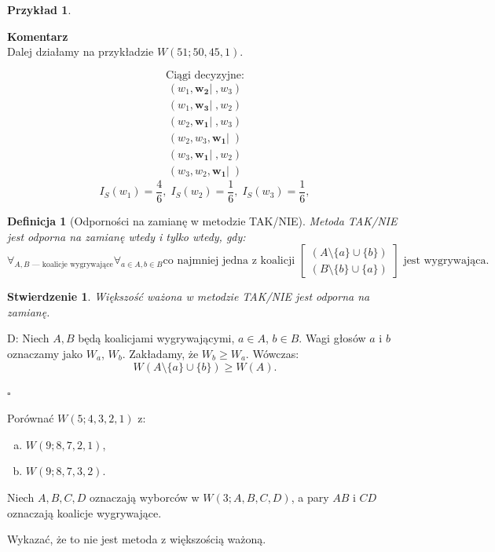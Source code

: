 \documentclass[12pt,a4paper]{article}
\newcounter{twierdzenie}
\theoremstyle{break}
\newcommand{\Komentarz}[1]{
	\begin{mdframed}[style=zadanie]
		\textbf{Komentarz}\\
		#1
	\end{mdframed}
	}
\newtheorem{definition}{Definicja}[section]
\newtheorem{example}{Przykład}[section]
\newtheorem{stwierdzenie}{Stwierdzenie}[section]
\begin{document}
	\begin{example}\end{example}
	\Komentarz{Dalej działamy na przykładzie $W(51;50,45,1)$.}
		
	\[
	\text{Ciągi decyzyjne:}
	\]
	\begin{align*}
		(w_1, \mathbf{w_2}|\;, w_3) \\
		(w_1, \mathbf{w_3}|\;, w_2) \\
		(w_2, \mathbf{w_1}|\;, w_3) \\
		(w_2, w_3, \mathbf{w_1}|\;) \\
		(w_3, \mathbf{w_1}|\;, w_2) \\
		(w_3, w_2, \mathbf{w_1}|\;)
	\end{align*}
	$$I_S(w_1) = \frac{4}{6}, \; I_S(w_2) = \frac{1}{6}, \; I_S(w_3) = \frac{1}{6},$$
	
	\begin{definition}[Odporności na zamianę w metodzie TAK/NIE]
		Metoda TAK/NIE jest odporna na zamianę wtedy i tylko wtedy, gdy:
		\[
		\forall_{A, B \text{ — koalicje wygrywające}} \forall_{a \in A, b \in B} \text{co najmniej jedna z koalicji } 
		\begin{bmatrix}
			(A \setminus \{a\} \cup \{b\}) \\
			(B \setminus \{b\} \cup \{a\})
		\end{bmatrix}
		\text{ jest wygrywająca.}
		\]
	\end{definition}
	\newpage

	\begin{stwierdzenie}
		Większość ważona w metodzie TAK/NIE jest odporna na zamianę.
	\end{stwierdzenie}
	
	D:  
	Niech $A, B$ będą koalicjami wygrywającymi, $a \in A$, $b \in B$.  
	Wagi głosów $a$ i $b$ oznaczamy jako $W_a$, $W_b$.  
	Zakładamy, że $W_b \geq W_a$. Wówczas:
	\[
	W(A \setminus \{a\} \cup \{b\}) \geq W(A).
	\]
	\begin{flushright}$\square$\end{flushright}
	
	\begin{zad}
		Porównać $W(5; 4, 3, 2, 1)$ z:
		\begin{enumerate}[a)]
			\item $W(9; 8, 7, 2, 1)$,
			\item $W(9; 8, 7, 3, 2)$.
		\end{enumerate}
	\end{zad}
	
	\begin{zad}
		Niech $A, B, C, D$ oznaczają wyborców w $W(3; A, B, C, D)$, a pary $AB$ i $CD$ oznaczają koalicje wygrywające.
		
		Wykazać, że to nie jest metoda z większością ważoną.
	\end{zad}
	
\end{document}
